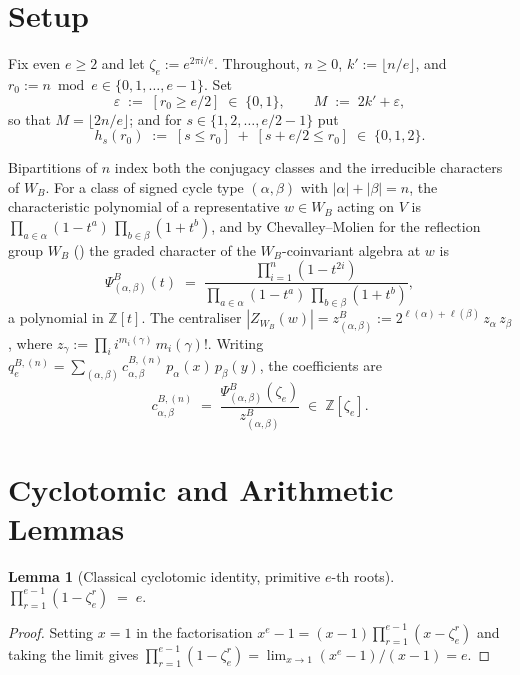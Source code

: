 \documentclass[11pt]{article}
\newtheorem{lemma}[theorem]{Lemma}
\theoremstyle{definition}
\theoremstyle{remark}
\newcommand{\zetae}{\zeta_e}
\newcommand{\ZZ}{\mathbb{Z}}
\newcommand{\WB}{W_B}
\newcommand{\PsiB}{\Psi^{B}}
\newcommand{\zB}{z^{B}}
\newcommand{\eps}{\varepsilon}
\begin{document}
\section{Setup}

Fix even $e \ge 2$ and let $\zetae := e^{2\pi i/e}$. Throughout, $n \ge 0$, $k' := \lfloor n/e\rfloor$, and $r_0 := n \bmod e \in \{0, 1, \ldots, e-1\}$. Set
\[
  \eps \;:=\; [r_0 \ge e/2] \;\in\; \{0, 1\}, \qquad M \;:=\; 2k' + \eps,
\]
so that $M = \lfloor 2n/e\rfloor$; and for $s \in \{1, 2, \ldots, e/2-1\}$ put
\[
  h_s(r_0) \;:=\; [s \le r_0] \;+\; [s + e/2 \le r_0] \;\in\; \{0, 1, 2\}.
\]

Bipartitions of $n$ index both the conjugacy classes and the irreducible characters of $\WB$. For a class of signed cycle type $(\alpha, \beta)$ with $|\alpha| + |\beta| = n$, the characteristic polynomial of a representative $w \in \WB$ acting on $V$ is $\prod_{a \in \alpha}(1 - t^a)\,\prod_{b \in \beta}(1 + t^b)$, and by Chevalley--Molien for the reflection group $\WB$ (\cite[\S 3.20]{Hum90}) the graded character of the $\WB$-coinvariant algebra at $w$ is
\begin{equation}\label{eq:cheva-molien-B}
  \PsiB_{(\alpha,\beta)}(t) \;=\; \frac{\prod_{i=1}^n(1 - t^{2i})}{\prod_{a \in \alpha}(1 - t^a)\,\prod_{b \in \beta}(1 + t^b)},
\end{equation}
a polynomial in $\ZZ[t]$. The centraliser $|Z_{\WB}(w)| = \zB_{(\alpha,\beta)} := 2^{\ell(\alpha)+\ell(\beta)}\, z_\alpha\, z_\beta$, where $z_\gamma := \prod_i i^{m_i(\gamma)}\, m_i(\gamma)!$. Writing $q_e^{B, (n)} = \sum_{(\alpha, \beta)} c^{B,(n)}_{\alpha,\beta}\, p_\alpha(x)\, p_\beta(y)$, the coefficients are
\begin{equation}\label{eq:c-def}
  c^{B,(n)}_{\alpha, \beta} \;=\; \frac{\PsiB_{(\alpha,\beta)}(\zetae)}{\zB_{(\alpha,\beta)}} \;\in\; \ZZ[\zetae].
\end{equation}

\section{Cyclotomic and Arithmetic Lemmas}\label{sec:lemmas}

\begin{lemma}[Classical cyclotomic identity, primitive $e$-th roots]\label{lem:cyclo-full}
$\displaystyle \prod_{r=1}^{e-1}(1 - \zetae^r) \;=\; e.$
\end{lemma}

\begin{proof}
Setting $x = 1$ in the factorisation $x^{e} - 1 = (x - 1)\prod_{r=1}^{e-1}(x - \zetae^r)$ and taking the limit gives $\prod_{r=1}^{e-1}(1 - \zetae^r) = \lim_{x \to 1}(x^e - 1)/(x - 1) = e$.
\end{proof}
\end{document}
